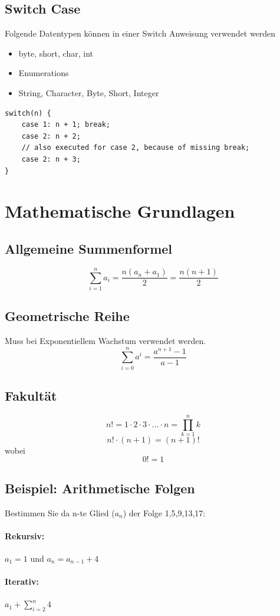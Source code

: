 \subsection{Switch Case}
Folgende Datentypen können in einer Switch Anweisung verwendet werden
\begin{itemize}
	\item byte, short, char, int
	\item Enumerations
	\item String, Character, Byte, Short, Integer
\end{itemize}
\begin{lstlisting}
switch(n) {
	case 1: n + 1; break; 
	case 2: n + 2; 
	// also executed for case 2, because of missing break;
	case 2: n + 3; 
}
\end{lstlisting}

\section{Mathematische Grundlagen}
\subsection{Allgemeine Summenformel}
\[
\sum\limits_{i=1}^{n} a_i = \frac{n(a_n + a_1)}{2} = \frac{n(n+1)}{2}
\]

\subsection{Geometrische Reihe}
Muss bei Exponentiellem Wachstum verwendet werden.
\[
\sum\limits_{i=0}^{n} a^i = \frac{a^{n+1} - 1}{a - 1}
\]

\subsection{Fakultät}
\[
n! = 1 \cdot 2 \cdot 3 \cdot ... \cdot n = \prod_{k=1}^n k
\]
\[
n! \cdot (n + 1) = (n+1)!
\]
wobei
\[
	0! = 1
\]

\subsection{Beispiel: Arithmetische Folgen}
Bestimmen Sie da n-te Glied ($a_n$) der Folge 1,5,9,13,17:
\paragraph{Rekursiv:} $a_1 = 1$ und $a_n= a_{n-1} + 4$
\paragraph{Iterativ:} $a_1 + \sum\limits_{i=2}^{n}4$
